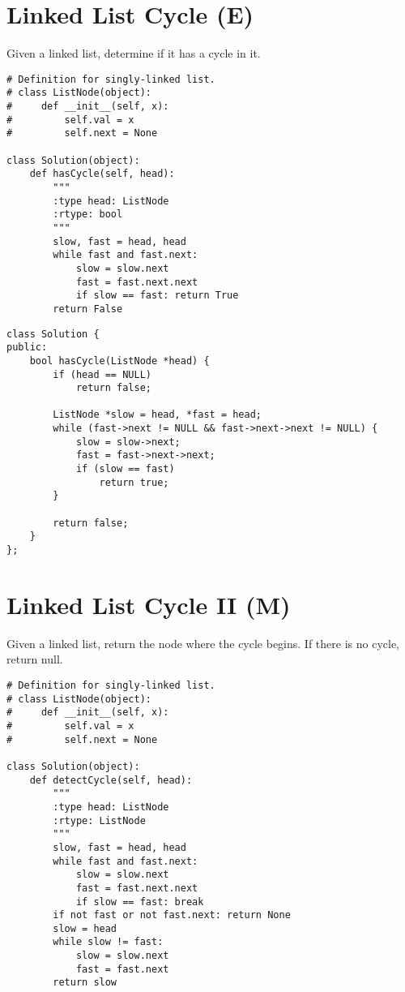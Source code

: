 \section{Linked List Cycle (E)}
Given a linked list, determine if it has a cycle in it. \\

\begin{lstlisting}
# Definition for singly-linked list.
# class ListNode(object):
#     def __init__(self, x):
#         self.val = x
#         self.next = None

class Solution(object):
    def hasCycle(self, head):
        """
        :type head: ListNode
        :rtype: bool
        """
        slow, fast = head, head
        while fast and fast.next:
            slow = slow.next
            fast = fast.next.next
            if slow == fast: return True
        return False
\end{lstlisting}            

\begin{lstlisting}
class Solution {
public:
    bool hasCycle(ListNode *head) {
        if (head == NULL)
            return false;
            
        ListNode *slow = head, *fast = head;
        while (fast->next != NULL && fast->next->next != NULL) {
            slow = slow->next;
            fast = fast->next->next;
            if (slow == fast)
                return true;
        }
        
        return false;
    }
};
\end{lstlisting}


\section{Linked List Cycle II (M)}
Given a linked list, return the node where the cycle begins. If there is no cycle, return null. \\
 
 \begin{lstlisting}
# Definition for singly-linked list.
# class ListNode(object):
#     def __init__(self, x):
#         self.val = x
#         self.next = None

class Solution(object):
    def detectCycle(self, head):
        """
        :type head: ListNode
        :rtype: ListNode
        """
        slow, fast = head, head
        while fast and fast.next:
            slow = slow.next
            fast = fast.next.next
            if slow == fast: break
        if not fast or not fast.next: return None
        slow = head
        while slow != fast:
            slow = slow.next
            fast = fast.next
        return slow
\end{lstlisting}
 
